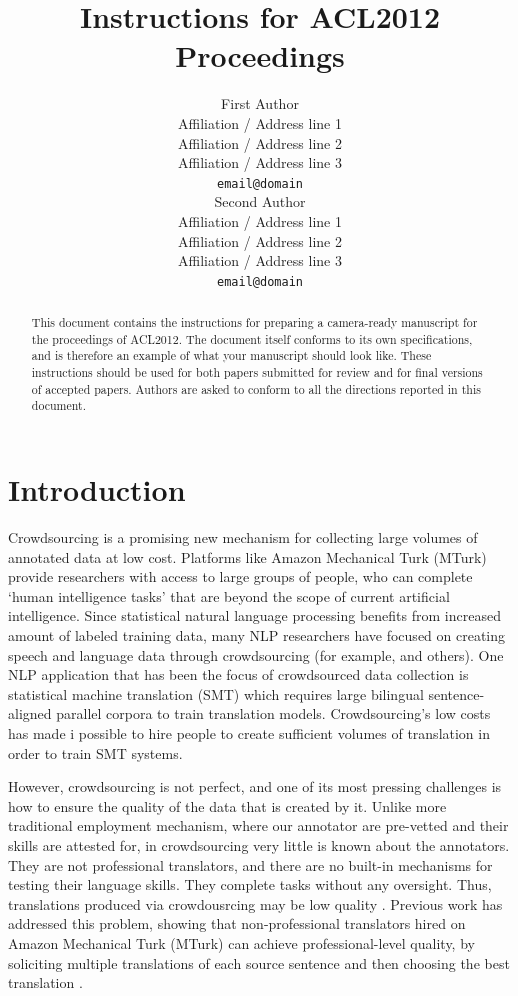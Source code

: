 \documentclass[11pt]{article}
\title{Instructions for ACL2012 Proceedings}
\author{First Author \\
  Affiliation / Address line 1 \\
  Affiliation / Address line 2 \\
  Affiliation / Address line 3 \\
  {\tt email@domain} \\\And
  Second Author \\
  Affiliation / Address line 1 \\
  Affiliation / Address line 2 \\
  Affiliation / Address line 3 \\
  {\tt email@domain} \\}
\date{}
\begin{document}
\maketitle
\begin{abstract}
  This document contains the instructions for preparing a camera-ready manuscript for the proceedings of ACL2012. The document itself conforms to its own specifications, and is therefore an example of what your manuscript should look like. These instructions should be used for both papers submitted for review and for final versions of accepted papers. Authors are asked to conform to all the directions reported in this document.
\end{abstract}

\section{Introduction}

Crowdsourcing is a promising new mechanism for collecting large volumes of annotated data at low cost.  Platforms like Amazon Mechanical Turk (MTurk) provide researchers with access to large groups of people, who can complete `human intelligence tasks' that are beyond the scope of current artificial intelligence.  Since statistical natural language processing benefits from increased amount of labeled training data, many NLP researchers have focused on creating speech and language data through crowdsourcing (for example,   and others).  One NLP application that has been the focus of crowdsourced data collection is statistical machine translation (SMT) which requires large bilingual sentence-aligned parallel corpora to train translation models.  Crowdsourcing's low costs has made i possible to hire people to create sufficient volumes of translation in order to train SMT systems.

However, crowdsourcing is not perfect, and one of its most pressing challenges is how to ensure the quality of the data that is created by it.  Unlike more traditional employment mechanism, where our annotator are pre-vetted and their skills are attested for, in crowdsourcing very little is known about the annotators.  They are not professional translators, and there are no built-in mechanisms for testing their language skills.  They complete tasks without any oversight. Thus, translations produced via crowdousrcing may be low quality .
Previous work has addressed this problem, showing that non-professional translators hired on Amazon Mechanical Turk (MTurk) can achieve professional-level quality, by soliciting multiple translations of each source sentence and then choosing the best translation \cite{zaidan-callisonburch:2011:ACL-HLT2011a}.
\end{document}

